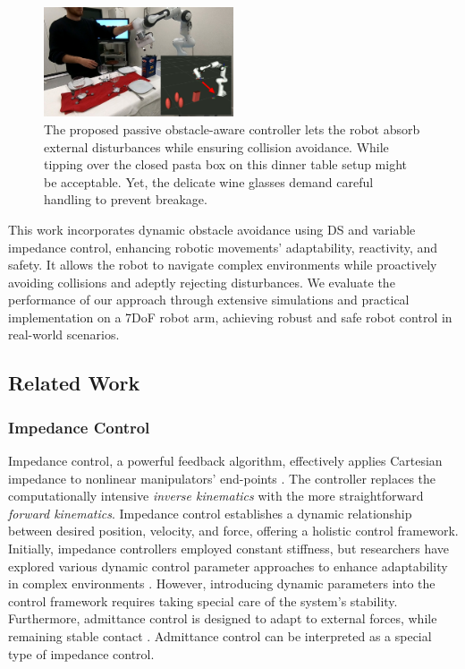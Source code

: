 \begin{figure}
\centerline{\includegraphics[width=0.5\textwidth]{figures/robot_arm_table_avoidance}}
\caption{
The proposed passive obstacle-aware controller lets the robot absorb external disturbances while ensuring collision avoidance. 
While tipping over the closed pasta box on this dinner table setup might be acceptable. Yet, the delicate wine glasses demand careful handling to prevent breakage.
}
\label{fig:table_avoidance_with_obstacle}
\end{figure}

This work incorporates dynamic obstacle avoidance using DS and variable impedance control, enhancing robotic movements' adaptability, reactivity, and safety. It allows the robot to navigate complex environments while proactively avoiding collisions and adeptly rejecting disturbances. We evaluate the performance of our approach through extensive simulations and practical implementation on a 7DoF robot arm, achieving robust and safe robot control in real-world scenarios.

\subsection{Related Work}

\subsubsection{Impedance Control}
Impedance control, a powerful feedback algorithm, effectively applies Cartesian impedance to nonlinear manipulators' end-points \parencite{takegaki1981new, hogan1985impedance}. The controller replaces the computationally intensive \textit{inverse kinematics} with the more straightforward \textit{forward kinematics}. Impedance control establishes a dynamic relationship between desired position, velocity, and force, offering a holistic control framework.
Initially, impedance controllers employed constant stiffness, but researchers have explored various dynamic control parameter approaches to enhance adaptability in complex environments \parencite{vanderborght2013variable, abu2020variable}. However, introducing dynamic parameters into the control framework requires taking special care of the system's stability.
Furthermore, admittance control is designed to adapt to external forces, while remaining stable contact \parencite{glosser1994implementation}. Admittance control can be interpreted as a special type of impedance control.

